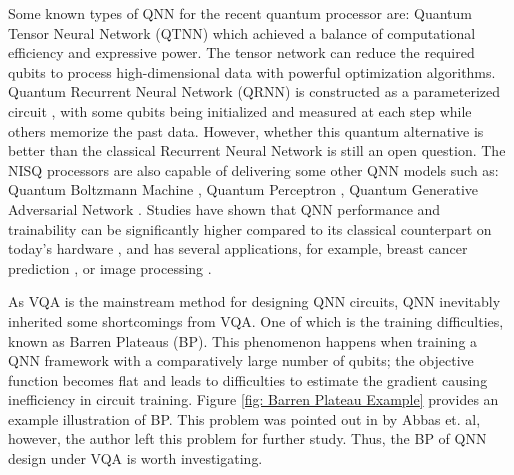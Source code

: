 Some known types of QNN for the recent quantum processor are: 
Quantum Tensor Neural Network (QTNN) \cite{hugginsQuantumMachineLearning2019} which achieved a balance of computational efficiency and expressive power. 
The tensor network can reduce the required qubits to process high-dimensional data with powerful optimization algorithms.
Quantum Recurrent Neural Network (QRNN) is constructed as a parameterized circuit \cite{takakiLearningTemporalData2021}, with some qubits being initialized and measured at each step while others memorize the past data.
However, whether this quantum alternative is better than the classical Recurrent Neural Network is still an open question.
The NISQ processors are also capable of delivering some other QNN models such as: 
Quantum Boltzmann Machine \cite{shinguBoltzmannMachineLearning2021}\cite{zoufalVariationalQuantumBoltzmann2021}, 
Quantum Perceptron \cite{kristensenArtificialSpikingQuantum2021}, 
Quantum Generative Adversarial Network \cite{dallaire-demersQuantumGenerativeAdversarial2018}\cite{lloydQuantumGenerativeAdversarial2018}. Studies have shown that QNN performance and trainability can be significantly higher compared to its classical counterpart on today's hardware \cite{abbasPowerQuantumNeural2021, colesSeekingQuantumAdvantage2021}, and has several applications, for example, breast cancer prediction \cite{liModelAlgorithmQuantuminspired2014}, or image processing \cite{matsuiQubitNeuralNetwork2009}.

As VQA is the mainstream method for designing QNN circuits, QNN inevitably inherited some shortcomings from VQA.
One of which is the training difficulties, known as Barren Plateaus (BP).
This phenomenon happens when training a QNN framework with a comparatively large number of qubits; the objective function becomes flat and leads to difficulties to estimate the gradient \cite{mccleanBarrenPlateausQuantum2018, zhaoAnalyzingBarrenPlateau2021} causing inefficiency in circuit training. 
Figure \ref{fig: Barren Plateau Example} provides an example illustration of BP.
This problem was pointed out in \cite{abbasPowerQuantumNeural2021} by Abbas et. al, however, the author left this problem for further study. 
Thus, the BP of QNN design under VQA is worth investigating.

